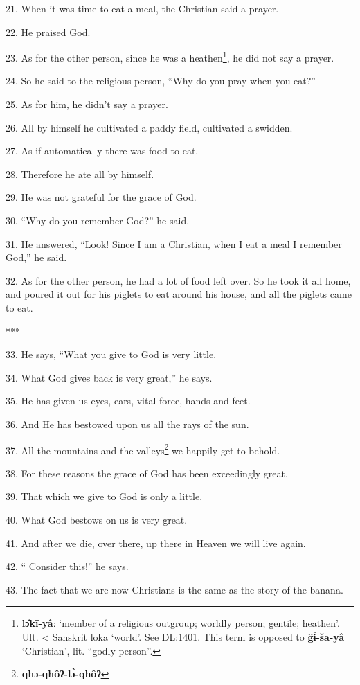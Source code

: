21. When it was time to eat a meal, the Christian said a prayer.

22. He praised God.

23. As for the other person, since he was a heathen\footnote{\textbf{lɔ̂kī-yâ}: `member of a religious outgroup; worldly person; gentile; heathen'. Ult. < Sanskrit loka `world'. See DL:1401. This term is opposed to \textbf{g̈ɨ̀-ša-yâ} `Christian', lit. ``godly person''.}, he did not say a prayer.

24. So he said to the religious person, ``Why do you pray when you eat?''

25. As for him, he didn't say a prayer.

26. All by himself he cultivated a paddy field, cultivated a swidden.

27. As if automatically there was food to eat.

28. Therefore he ate all by himself.

29. He was not grateful for the grace of God.

30. ``Why do you remember God?'' he said.

31. He answered, ``Look! Since I am a Christian, when I eat a meal I remember God,''
he said.

32. As for the other person, he had a lot of food left over. So he took it all
home, and poured it out for his piglets to eat around his house, and all the piglets
came to eat.

***

33. He says, ``What you give to God is very little.

34. What God gives back is very great,'' he says.

35. He has given us eyes, ears, vital force, hands and feet.

36. And He has bestowed upon us all the rays of the sun.

37. All the mountains and the valleys\footnote{\textbf{qhɔ-qhôʔ-lɔ̀-qhôʔ}} we happily get to behold.

38. For these reasons the grace of God has been exceedingly great.

39. That which we give to God is only a little.

40. What God bestows on us is very great.

41. And after we die, over there, up there in Heaven we will live again.

42. `` Consider this!'' he says.

43. The fact that we are now Christians is the same as the story of the banana.


